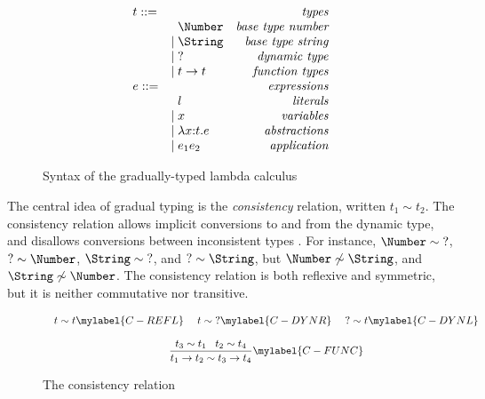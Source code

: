 \begin{figure}[!ht]
\dstart
$$
\begin{array}{llr}
t ::= & & \emph{types}\\
& \;\; \Number & \emph{base type number}\\
& | \; \String & \emph{base type string}\\
& | \; ? & \emph{dynamic type}\\
& | \; t \rightarrow t & \emph{function types}\\
e ::= & & \emph{expressions}\\
& \;\; l & \emph{literals}\\
& | \; x & \emph{variables}\\
& | \; \lambda x{:}t{.}e & \emph{abstractions}\\
& | \; e_{1} e_{2} & \emph{application}
\end{array}
$$
\dend
\caption{Syntax of the gradually-typed lambda calculus}
\label{fig:gtlc}
\end{figure}

The central idea of gradual typing is the \emph{consistency}
relation, written $t_{1} \sim t_{2}$.
The consistency relation allows implicit conversions to and from the
dynamic type, and disallows conversions between inconsistent types
\citep{siek2006gradual}.
For instance, $\Number \sim \;?$, $? \sim \Number$,
$\String \sim \;?$, and $? \sim \String$,
but $\Number \not\sim \String$, and
$\String \not\sim \Number$.
The consistency relation is both reflexive and symmetric, but
it is neither commutative nor transitive.

\begin{figure}[!ht]
\dstart
$$
\begin{array}{c}
\begin{array}{c}
t \sim t \mylabel{C-REFL}
\end{array}
\;
\begin{array}{c}
t \sim \;? \mylabel{C-DYNR}
\end{array}
\;
\begin{array}{c}
? \sim t \mylabel{C-DYNL}
\end{array}
\\ \\
\begin{array}{c}
\dfrac{t_{3} \sim t_{1} \;\;\; t_{2} \sim t_{4}}
      {t_{1} \rightarrow t_{2} \sim t_{3} \rightarrow t_{4}} \mylabel{C-FUNC}
\end{array}
\end{array}
$$
\dend
\caption{The consistency relation}
\label{fig:consistency}
\end{figure}

